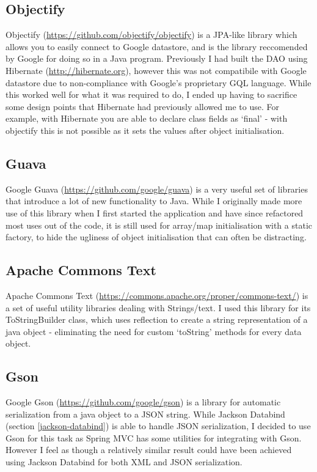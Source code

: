 \documentclass[12pt]{article}
\begin{document}
  \subsection{Objectify}
    Objectify (\url{https://github.com/objectify/objectify}) is a JPA-like library which allows you to easily connect to Google datastore, and is the library reccomended by Google for doing so in a Java program. Previously I had built the DAO using Hibernate (\url{http://hibernate.org}), however this was not compatibile with Google datastore due to non-compliance with Google's proprietary GQL language. While this worked well for what it was required to do, I ended up having to sacrifice some design points that Hibernate had previously allowed me to use. For example, with Hibernate you are able to declare class fields as ‘final’ - with objectify this is not possible as it sets the values after object initialisation.

  \subsection{Guava}
    Google Guava (\url{https://github.com/google/guava}) is a very useful set of libraries that introduce a lot of new functionality to Java. While I originally made more use of this library when I first started the application and have since refactored most uses out of the code, it is still used for array/map initialisation with a static factory, to hide the ugliness of object initialisation that can often be distracting.

  \subsection{Apache Commons Text}
    Apache Commons Text (\url{https://commons.apache.org/proper/commons-text/}) is a set of useful utility libraries dealing with Strings/text. I used this library for its ToStringBuilder class, which uses reflection to create a string representation of a java object - eliminating the need for custom ‘toString’ methods for every data object.

  \subsection{Gson}
    Google Gson (\url{https://github.com/google/gson}) is a library for automatic serialization from a java object to a JSON string. While Jackson Databind (section \ref{jackson-databind}) is able to handle JSON serialization, I decided to use Gson for this task as Spring MVC has some utilities for integrating with Gson. However I feel as though a relatively similar result could have been achieved using Jackson Databind for both XML and JSON serialization.
\end{document}
